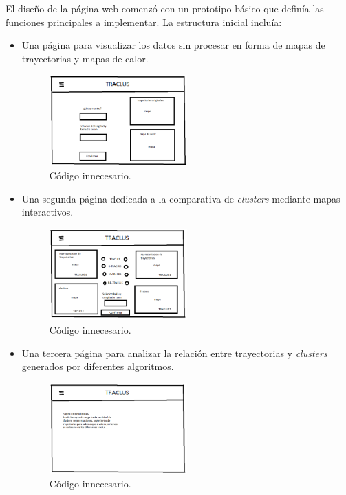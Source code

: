 El diseño de la página web comenzó con un prototipo básico que definía las funciones principales a implementar. La estructura inicial incluía:  
\begin{itemize}
    \item Una página para visualizar los datos sin procesar en forma de mapas de trayectorias y mapas de calor.
    
    \begin{figure}[h!]
    		\centering
    		\includegraphics[width=0.5\textwidth]{img/prototipo_web1.png}
    		\caption{Código innecesario.}
	\end{figure}
	\FloatBarrier
    
    \item Una segunda página dedicada a la comparativa de \textit{clusters} mediante mapas interactivos.
    
    \begin{figure}[h!]
    		\centering
    		\includegraphics[width=0.5\textwidth]{img/prototipo_web2.png}
    		\caption{Código innecesario.}
	\end{figure}
	\FloatBarrier
    
    \item Una tercera página para analizar la relación entre trayectorias y \textit{clusters} generados por diferentes algoritmos.
    
    \begin{figure}[h!]
    		\centering
    		\includegraphics[width=0.5\textwidth]{img/prototipo_web3.png}
    		\caption{Código innecesario.}
	\end{figure}
	\FloatBarrier
\end{itemize}

